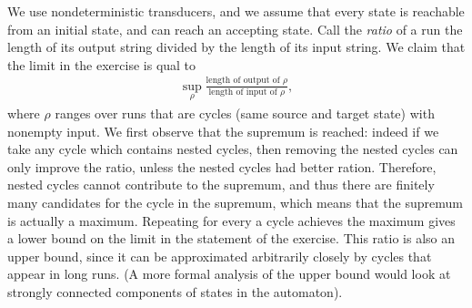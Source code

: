 {We use nondeterministic transducers, and we assume that every state is reachable from an initial state, and can reach an accepting state. Call the \emph{ratio} of a run the length of its output string divided by the length of its input string. We claim that the limit in the exercise is qual to 
\begin{align*}
    \sup_\rho \frac{\text{length of output of $\rho$}}{\text{length of input of $\rho$}},
\end{align*}
where $\rho$ ranges over runs that are cycles (same source and target state) with nonempty input. We first observe that the supremum is reached: indeed if we take any cycle which contains nested cycles, then removing the nested cycles can only improve the ratio, unless the nested cycles had better ration. Therefore, nested cycles cannot contribute to the supremum, and thus there are finitely many candidates for the cycle in the supremum, which means that the supremum is actually a maximum. Repeating for every a cycle achieves the maximum gives a lower bound on the limit in the statement of the exercise. This ratio is also an upper bound, since it can be approximated arbitrarily closely by cycles that appear in long runs. (A more formal analysis of the upper bound would look at strongly connected components of states in the automaton).
}



